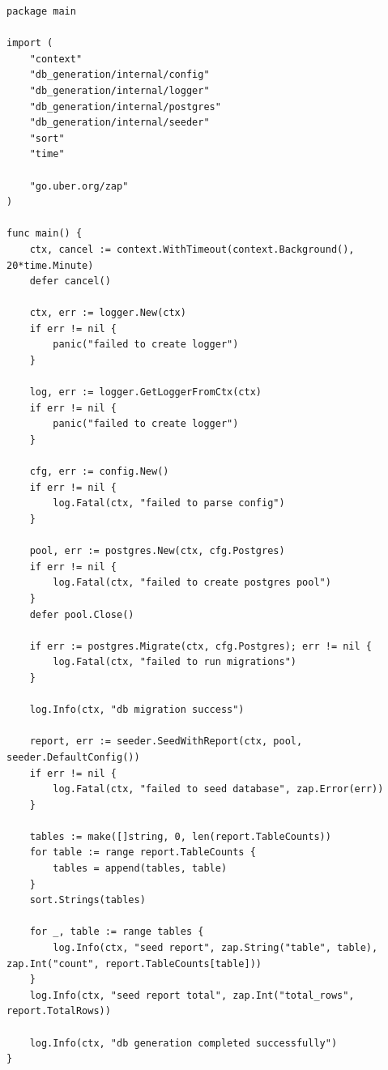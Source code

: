\begin{lstlisting}[style=gostyle, caption={Точка входа программы (cmd/seeder/main.go)}, label={lst:goMain}]
package main

import (
	"context"
	"db_generation/internal/config"
	"db_generation/internal/logger"
	"db_generation/internal/postgres"
	"db_generation/internal/seeder"
	"sort"
	"time"

	"go.uber.org/zap"
)

func main() {
	ctx, cancel := context.WithTimeout(context.Background(), 20*time.Minute)
	defer cancel()

	ctx, err := logger.New(ctx)
	if err != nil {
		panic("failed to create logger")
	}

	log, err := logger.GetLoggerFromCtx(ctx)
	if err != nil {
		panic("failed to create logger")
	}

	cfg, err := config.New()
	if err != nil {
		log.Fatal(ctx, "failed to parse config")
	}

	pool, err := postgres.New(ctx, cfg.Postgres)
	if err != nil {
		log.Fatal(ctx, "failed to create postgres pool")
	}
	defer pool.Close()

	if err := postgres.Migrate(ctx, cfg.Postgres); err != nil {
		log.Fatal(ctx, "failed to run migrations")
	}

	log.Info(ctx, "db migration success")

	report, err := seeder.SeedWithReport(ctx, pool, seeder.DefaultConfig())
	if err != nil {
		log.Fatal(ctx, "failed to seed database", zap.Error(err))
	}

	tables := make([]string, 0, len(report.TableCounts))
	for table := range report.TableCounts {
		tables = append(tables, table)
	}
	sort.Strings(tables)

	for _, table := range tables {
		log.Info(ctx, "seed report", zap.String("table", table), zap.Int("count", report.TableCounts[table]))
	}
	log.Info(ctx, "seed report total", zap.Int("total_rows", report.TotalRows))

	log.Info(ctx, "db generation completed successfully")
}
\end{lstlisting}
\newpage

